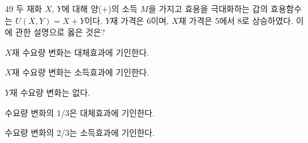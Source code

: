 \begin{question}{49}
두 재화 $X$, $Y$에 대해 양(+)의 소득 $M$을 가지고 효용을 극대화하는 갑의 효용함수는 $U(X,Y)=X+Y$이다. $Y$재 가격은 6이며, $X$재 가격은 5에서 8로 상승하였다. 이에 관한 설명으로 옳은 것은?
\begin{choices}
  \item $X$재 수요량 변화는 대체효과에 기인한다.
  \item $X$재 수요량 변화는 소득효과에 기인한다.
  \item $Y$재 수요량 변화는 없다.
  \item 수요량 변화의 1/3은 대체효과에 기인한다.
  \item 수요량 변화의 2/3는 소득효과에 기인한다.
\end{choices}
\end{question}
